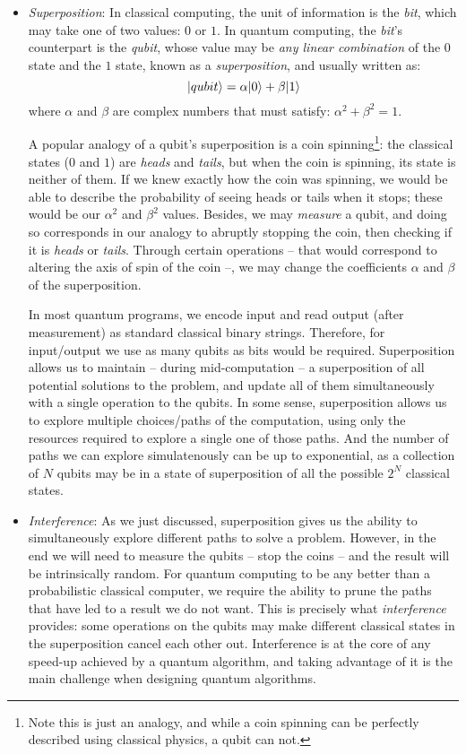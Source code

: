 \begin{itemize}

\item \textit{Superposition}: In classical computing, the unit of information is the \textit{bit}, which may take one of two values: \(0\) or \(1\). In quantum computing, the \textit{bit}'s counterpart is the \textit{qubit}, whose value may be \textit{any linear combination} of the \(0\) state and the \(1\) state, known as a \textit{superposition}, and usually written as: \[\vert qubit \rangle = \alpha\vert 0 \rangle + \beta\vert 1 \rangle\] where \(\alpha\) and \(\beta\) are complex numbers that must satisfy: \(\alpha^2 + \beta^2 = 1\).

A popular analogy of a qubit's superposition is a coin spinning\footnote{Note this is just an analogy, and while a coin spinning can be perfectly described using classical physics, a qubit can not.}: the classical states (\(0\) and \(1\)) are \textit{heads} and \textit{tails}, but when the coin is spinning, its state is neither of them. If we knew exactly how the coin was spinning, we would be able to describe the probability of seeing heads or tails when it stops; these would be our \(\alpha^2\) and \(\beta^2\) values. Besides, we may \textit{measure} a qubit, and doing so corresponds in our analogy to abruptly stopping the coin, then checking if it is \textit{heads} or \textit{tails}. Through certain operations -- that would correspond to altering the axis of spin of the coin --, we may change the coefficients \(\alpha\) and \(\beta\) of the superposition. 

In most quantum programs, we encode input and read output (after measurement) as standard classical binary strings. Therefore, for input/output we use as many qubits as bits would be required. Superposition allows us to maintain -- during mid-computation -- a superposition of all potential solutions to the problem, and update all of them simultaneously with a single operation to the qubits. In some sense, superposition allows us to explore multiple choices/paths of the computation, using only the resources required to explore a single one of those paths. And the number of paths we can explore simulatenously can be up to exponential, as a collection of \(N\) qubits may be in a state of superposition of all the possible \(2^N\) classical states.

\item \textit{Interference}: As we just discussed, superposition gives us the ability to simultaneously explore different paths to solve a problem. However, in the end we will need to measure the qubits -- stop the coins -- and the result will be intrinsically random. For quantum computing to be any better than a probabilistic classical computer, we require the ability to prune the paths that have led to a result we do not want. This is precisely what \textit{interference} provides: some operations on the qubits may make different classical states in the superposition cancel each other out. Interference is at the core of any speed-up achieved by a quantum algorithm, and taking advantage of it is the main challenge when designing quantum algorithms.


\end{itemize}
